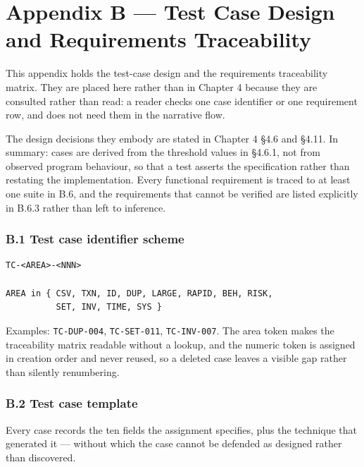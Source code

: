 \documentclass[
  12pt,
]{report}
\begin{document}
\clearpage

\chapter{Appendix B --- Test Case Design and Requirements
Traceability}\label{appendix-b-test-case-design-and-requirements-traceability}

This appendix holds the test-case design and the requirements
traceability matrix. They are placed here rather than in Chapter 4
because they are consulted rather than read: a reader checks one case
identifier or one requirement row, and does not need them in the
narrative flow.

The design decisions they embody are stated in Chapter 4 §4.6 and §4.11.
In summary: cases are derived from the threshold values in §4.6.1, not
from observed program behaviour, so that a test asserts the
specification rather than restating the implementation. Every functional
requirement is traced to at least one suite in B.6, and the requirements
that cannot be verified are listed explicitly in B.6.3 rather than left
to inference.

\subsection{B.1 Test case identifier
scheme}\label{b.1-test-case-identifier-scheme}

\begin{verbatim}
TC-<AREA>-<NNN>

AREA in { CSV, TXN, ID, DUP, LARGE, RAPID, BEH, RISK,
          SET, INV, TIME, SYS }
\end{verbatim}

Examples: \texttt{TC-DUP-004}, \texttt{TC-SET-011}, \texttt{TC-INV-007}.
The area token makes the traceability matrix readable without a lookup,
and the numeric token is assigned in creation order and never reused, so
a deleted case leaves a visible gap rather than silently renumbering.

\subsection{B.2 Test case template}\label{b.2-test-case-template}

Every case records the ten fields the assignment specifies, plus the
technique that generated it --- without which the case cannot be
defended as designed rather than discovered.
\end{document}
